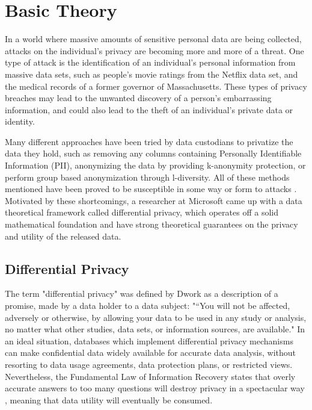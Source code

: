 
\chapter{Basic Theory}
In a world where massive amounts of sensitive personal data are being collected, attacks on the individual's privacy are becoming more and more of a threat. One type of attack is the identification of an individual's personal information from massive data sets, such as people's movie ratings from the Netflix data set\cite{narayanan2008robust}, and the medical records of a former governor of Massachusetts\cite{barth2012re}. These types of privacy breaches may lead to the unwanted discovery of a person's embarrassing information, and could also lead to the theft of an individual's private data or identity.  

Many different approaches have been tried by data custodians to privatize the data they hold, such as removing any columns containing Personally Identifiable Information (PII), anonymizing the data by providing k-anonymity protection\cite{sweeney2002k}, or perform group based anonymization through l-diversity\cite{machanavajjhala2007diversity}. All of these methods mentioned have been proved to be susceptible in some way or form to attacks \cite{ganta2008composition}. Motivated by these shortcomings, a researcher at Microsoft came up with a data theoretical framework called differential privacy, which operates off a solid mathematical foundation and have strong theoretical guarantees on the privacy and utility of the released data.

\section{Differential Privacy}
The term "differential privacy" was defined by Dwork as a description of a promise, made by a data holder to a data subject: "“You will not be affected, adversely or otherwise, by allowing your data to be used in any study or analysis, no matter what other studies, data sets, or information sources, are available." \cite{dwork2013algorithmic}
In an ideal situation, databases which implement differential privacy mechanisms can make confidential data widely available for accurate data analysis, without resorting to data usage agreements, data protection plans, or restricted views. Nevertheless, the Fundamental Law of Information Recovery states that overly accurate answers to too many questions will destroy privacy in a spectacular way \cite{dwork2013algorithmic}, meaning that data utility will eventually be consumed.

